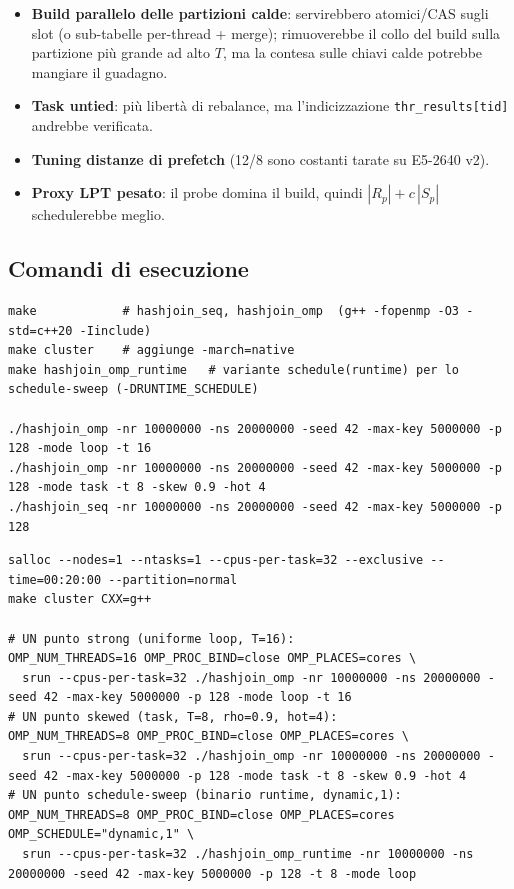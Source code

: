 \documentclass[11pt,a4paper]{article}
\begin{document}
\begin{itemize}
  \item \textbf{Build parallelo delle partizioni calde}: servirebbero atomici/CAS sugli slot (o sub-tabelle per-thread + merge); rimuoverebbe il collo del build sulla partizione più grande ad alto $T$, ma la contesa sulle chiavi calde potrebbe mangiare il guadagno.
  \item \textbf{Task untied}: più libertà di rebalance, ma l'indicizzazione \texttt{thr\_results[tid]} andrebbe verificata.
  \item \textbf{Tuning distanze di prefetch} (12/8 sono costanti tarate su E5-2640 v2).
  \item \textbf{Proxy LPT pesato}: il probe domina il build, quindi $|R_p|+c\,|S_p|$ schedulerebbe meglio.
\end{itemize}

\subsection{Comandi di esecuzione}

\begin{lstlisting}[style=bash, caption={Build (makefile). CLI: -nr -ns -seed -max-key -p -mode loop|task -t [-skew -hot].}]
make            # hashjoin_seq, hashjoin_omp  (g++ -fopenmp -O3 -std=c++20 -Iinclude)
make cluster    # aggiunge -march=native
make hashjoin_omp_runtime   # variante schedule(runtime) per lo schedule-sweep (-DRUNTIME_SCHEDULE)

./hashjoin_omp -nr 10000000 -ns 20000000 -seed 42 -max-key 5000000 -p 128 -mode loop -t 16
./hashjoin_omp -nr 10000000 -ns 20000000 -seed 42 -max-key 5000000 -p 128 -mode task -t 8 -skew 0.9 -hot 4
./hashjoin_seq -nr 10000000 -ns 20000000 -seed 42 -max-key 5000000 -p 128
\end{lstlisting}

\begin{lstlisting}[style=bash, caption={Sul cluster: stesso nodo di M2. Pinning OpenMP obbligatorio.}]
salloc --nodes=1 --ntasks=1 --cpus-per-task=32 --exclusive --time=00:20:00 --partition=normal
make cluster CXX=g++

# UN punto strong (uniforme loop, T=16):
OMP_NUM_THREADS=16 OMP_PROC_BIND=close OMP_PLACES=cores \
  srun --cpus-per-task=32 ./hashjoin_omp -nr 10000000 -ns 20000000 -seed 42 -max-key 5000000 -p 128 -mode loop -t 16
# UN punto skewed (task, T=8, rho=0.9, hot=4):
OMP_NUM_THREADS=8 OMP_PROC_BIND=close OMP_PLACES=cores \
  srun --cpus-per-task=32 ./hashjoin_omp -nr 10000000 -ns 20000000 -seed 42 -max-key 5000000 -p 128 -mode task -t 8 -skew 0.9 -hot 4
# UN punto schedule-sweep (binario runtime, dynamic,1):
OMP_NUM_THREADS=8 OMP_PROC_BIND=close OMP_PLACES=cores OMP_SCHEDULE="dynamic,1" \
  srun --cpus-per-task=32 ./hashjoin_omp_runtime -nr 10000000 -ns 20000000 -seed 42 -max-key 5000000 -p 128 -t 8 -mode loop
\end{lstlisting}
\end{document}
